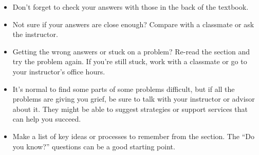 \begin{itemize}
\item Don't forget to check your answers with those in the back of the textbook. 
\item Not sure if your answers are close enough? Compare with a classmate or ask the instructor.  
\item Getting the wrong answers or stuck on a problem?  Re-read the section and try the problem again.   If you're still stuck, work with a classmate or go to your instructor's office hours.
\item It's normal to find some parts of some problems difficult, but if all the problems are giving you grief, be sure to talk with your instructor or advisor about it.  They might be able to suggest strategies or support services that can help you succeed.
\item Make a list of key ideas or processes to remember from the section.  The ``Do you know?'' questions can be a good starting point.
\end{itemize}



